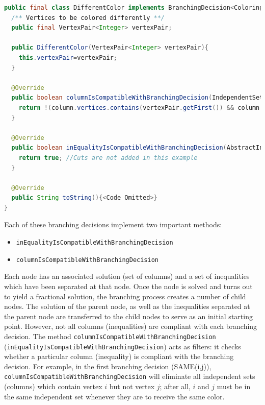\documentclass[a4paper]{article}
\newenvironment{myblock}[1]{%
    \tcolorbox[beamer,%
    noparskip,breakable,
    colback=lightBlueCodeBlock,colframe=darkBlueCodeBlock,%
    colbacklower=darkBlueCodeBlock!75!lightBlueCodeBlock,%
    coltitle=blueTitleCodeBlock,
    title=#1]}%
    {\endtcolorbox}
\newcommand{\code}[1]{\lstinline[language=java, style=seminar]!#1!}
\begin{document}
\begin{myblock}{Branching decision 2: DIFFER}
\begin{lstlisting}[language=java, style=eclipseArticle, xleftmargin=2em]  
public final class DifferentColor implements BranchingDecision<ColoringGraph, IndependentSet>{
  /** Vertices to be colored differently **/
  public final VertexPair<Integer> vertexPair;

  public DifferentColor(VertexPair<Integer> vertexPair){
    this.vertexPair=vertexPair;
  }

  @Override
  public boolean columnIsCompatibleWithBranchingDecision(IndependentSet column) {
    return !(column.vertices.contains(vertexPair.getFirst()) && column.vertices.contains(vertexPair.getSecond()));
  }

  @Override
  public boolean inEqualityIsCompatibleWithBranchingDecision(AbstractInequality inequality) {
    return true; //Cuts are not added in this example
  }

  @Override
  public String toString(){<Code Omitted>}
}
\end{lstlisting}
\end{myblock}
Each of these branching decisions implement two important methods:
\begin{itemize}
 \item \code{inEqualityIsCompatibleWithBranchingDecision}
 \item \code{columnIsCompatibleWithBranchingDecision}
\end{itemize}
Each node has an associated solution (set of columns) and a set of inequalities which have been separated at that node. Once the node is solved and turns out to yield a fractional solution, the branching process creates a number of child nodes. The solution of the parent node, as well as the inequalities separated at the parent node are transferred to the child nodes to serve as an initial starting point. However, not all columns (inequalities) are compliant with each branching decision. The method \code{columnIsCompatibleWithBranchingDecision} (\code{inEqualityIsCompatibleWithBranchingDecision}) acts as filters: it checks whether a particular column (inequality) is compliant with the branching decision. For example, in the first branching decision (SAME(i,j)), \code{columnIsCompatibleWithBranchingDecision} will eliminate all independent sets (columns) which contain vertex $i$ but not vertex $j$; after all, $i$ and $j$ must be in the same independent set whenever they are to receive the same color.\\
\end{document}
